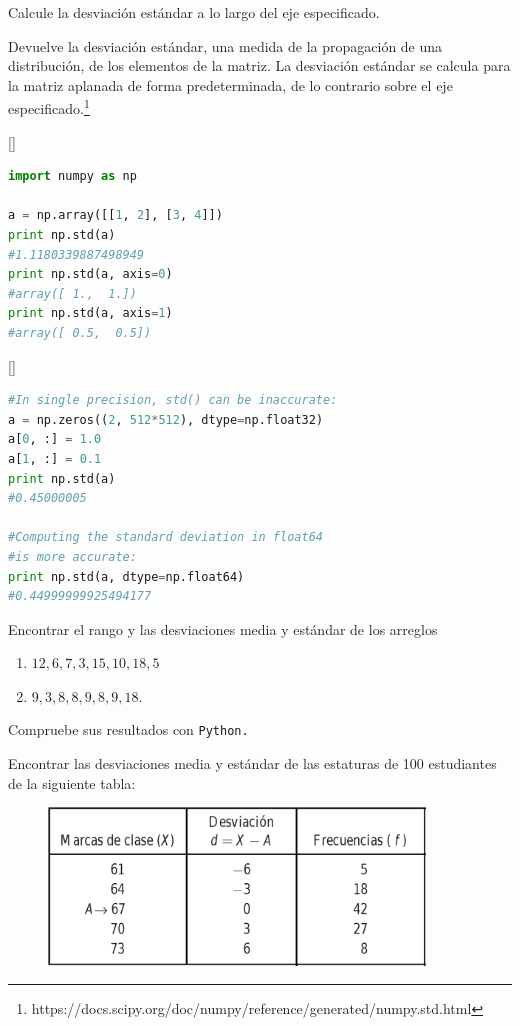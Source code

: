 Calcule la desviación estándar a lo largo del eje especificado.

Devuelve la desviación estándar, una medida de la propagación de una distribución, de los elementos de la matriz. La desviación estándar se calcula para la matriz aplanada de forma predeterminada, de lo contrario sobre el eje especificado.\footnote{https://docs.scipy.org/doc/numpy/reference/generated/numpy.std.html}

[]
\begin{lstlisting}[language=Python]
import numpy as np

a = np.array([[1, 2], [3, 4]])
print np.std(a)
#1.1180339887498949
print np.std(a, axis=0)
#array([ 1.,  1.])
print np.std(a, axis=1)
#array([ 0.5,  0.5])
\end{lstlisting}


[]
\begin{lstlisting}[language=Python]
#In single precision, std() can be inaccurate:
a = np.zeros((2, 512*512), dtype=np.float32)
a[0, :] = 1.0
a[1, :] = 0.1
print np.std(a)
#0.45000005

#Computing the standard deviation in float64
#is more accurate:
print np.std(a, dtype=np.float64)
#0.44999999925494177
\end{lstlisting}





 \begin{problema}
 \label{problema:4.3}
  Encontrar el rango y las desviaciones media y estándar de los arreglos 
  \begin{enumerate}
   \item $12,6,7,3,15,10,18,5$ 
   \item $9,3,8,8,9,8,9,18.$
  \end{enumerate}

  Compruebe sus resultados con \texttt{Python.}
 \end{problema}



 
 \begin{problema}
  \label{problema:4.4}
  Encontrar las desviaciones media y estándar de las estaturas de 100 estudiantes de la siguiente tabla:
  \begin{figure}[ht]
  \centering
  \includegraphics[width=10cm,keepaspectratio=true]{./images/tab0302.png}
  \label{tab:0302}
 \end{figure}

 \end{problema}

